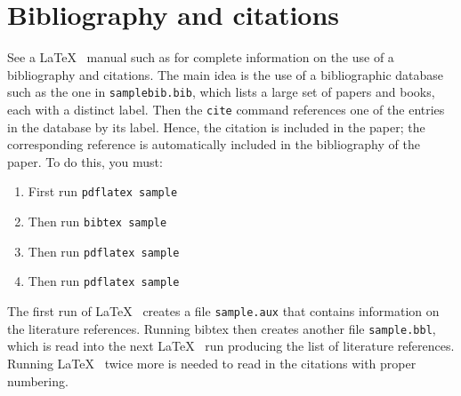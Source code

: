 \section{Bibliography and citations}
See a \LaTeX~ manual such as \cite{go-mi-sa:latex} for complete information on the use of a bibliography and citations. The main idea is the use of a bibliographic database such as the one in {\tt samplebib.bib}, which lists a large set of papers and books, each with a distinct label.  Then the  {\tt cite} command references one of the entries in the database by its label.  Hence, the citation is included in the paper; the corresponding reference is automatically included in the bibliography of the paper.  To do this, you must:
\begin{enumerate}
\item First run {\tt pdflatex sample}
\item Then run {\tt bibtex sample}
\item Then run {\tt pdflatex sample}
\item Then run {\tt pdflatex sample}
\end{enumerate}

The first run of \LaTeX~ creates a file {\tt sample.aux}
that contains information on the literature references.
Running bibtex \cite{dykstra:forest} then creates another file {\tt sample.bbl}, which is read into
the next \LaTeX~ run producing the list of literature references.  
Running \LaTeX~ twice more is needed to read in the citations with proper numbering. 

